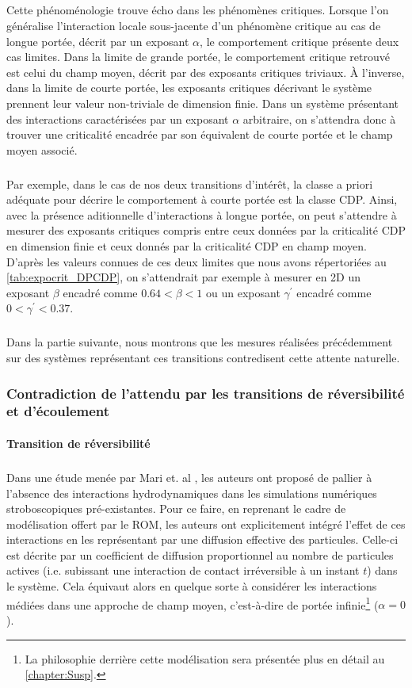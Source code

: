 \subparagraph{}Cette phénoménologie trouve écho dans les phénomènes critiques. Lorsque l'on généralise l'interaction locale sous-jacente d'un phénomène critique au cas de longue portée, décrit par un exposant $\alpha$, le comportement critique présente deux cas limites. Dans la limite de grande portée, le comportement critique retrouvé est celui du champ moyen, décrit par des exposants critiques triviaux. \`A l'inverse, dans la limite de courte portée, les exposants critiques décrivant le système prennent leur valeur non-triviale de dimension finie. Dans un système présentant des interactions caractérisées par un exposant $\alpha$ arbitraire, on s'attendra donc à trouver une criticalité encadrée par son équivalent de courte portée et le champ moyen associé.

\subparagraph{}Par exemple, dans le cas de nos deux transitions d'intérêt, la classe a priori adéquate pour décrire le comportement à courte portée est la classe CDP. Ainsi, avec la présence aditionnelle d'interactions à longue portée, on peut s'attendre à mesurer des exposants critiques compris entre ceux données par la criticalité CDP en dimension finie et ceux donnés par la criticalité CDP en champ moyen. D'après les valeurs connues de ces deux limites que nous avons répertoriées au \autoref{tab:expocrit_DPCDP}, on s'attendrait par exemple à mesurer en 2D un exposant $\beta$ encadré comme $0.64 < \beta < 1$ ou un exposant $\gamma^\prime$ encadré comme $0 < \gamma^\prime < 0.37$.

\subparagraph{}Dans la partie suivante, nous montrons que les mesures réalisées précédemment sur des systèmes représentant ces transitions contredisent cette attente naturelle.

\subsubsection{Contradiction de l'attendu par les transitions de réversibilité et d'écoulement}

\paragraph{Transition de réversibilité}

\subparagraph{}Dans une étude menée par Mari et. al \cite{mari_absorbing_2022}, les auteurs ont proposé de pallier à l'absence des interactions hydrodynamiques dans les simulations numériques stroboscopiques pré-existantes. Pour ce faire, en reprenant le cadre de modélisation offert par le ROM, les auteurs ont explicitement intégré l'effet de ces interactions en les représentant par une diffusion effective des particules. Celle-ci est décrite par un coefficient de diffusion proportionnel au nombre de particules actives (i.e. subissant une interaction de contact irréversible à un instant $t$) dans le système. Cela équivaut alors en quelque sorte à considérer les interactions médiées dans une approche de champ moyen, c'est-à-dire de portée infinie\footnote{La philosophie derrière cette modélisation sera présentée plus en détail au \autoref{chapter:Susp}.} ($\alpha = 0$). 

